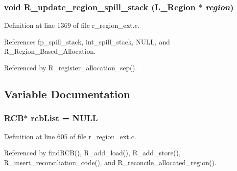 \subsubsection{\setlength{\rightskip}{0pt plus 5cm}void R\_\-update\_\-region\_\-spill\_\-stack (L\_\-Region $\ast$ {\em region})}\label{r__region__ext_8c_376c0fc08f9541f468b4c94694481c9d}




Definition at line 1369 of file r\_\-region\_\-ext.c.

References fp\_\-spill\_\-stack, int\_\-spill\_\-stack, NULL, and R\_\-Region\_\-Based\_\-Allocation.

Referenced by R\_\-register\_\-allocation\_\-sep().

\subsection{Variable Documentation}
\subsubsection{\setlength{\rightskip}{0pt plus 5cm}\bf{RCB}$\ast$ \bf{rcb\-List} = \bf{NULL}}\label{r__region__ext_8c_8db251b5223b8276392a6005929047b5}




Definition at line 605 of file r\_\-region\_\-ext.c.

Referenced by find\-RCB(), R\_\-add\_\-load(), R\_\-add\_\-store(), R\_\-insert\_\-reconciliation\_\-code(), and R\_\-reconcile\_\-allocated\_\-region().